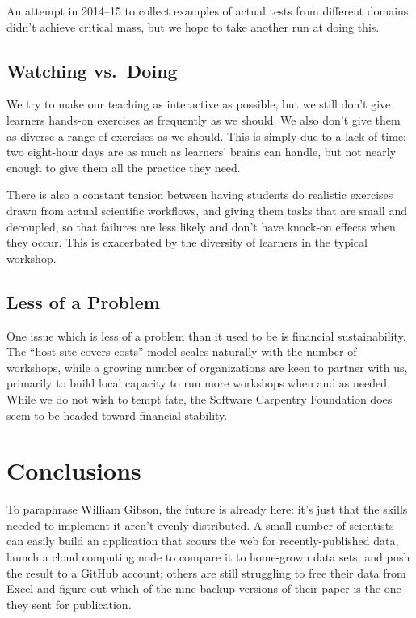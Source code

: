 \documentclass[10pt,a4paper,twocolumn]{article}
\begin{document}
An attempt in 2014--15 to collect examples of actual tests from
different domains didn't achieve critical mass, but we hope to take
another run at doing this.

\subsection{Watching vs.\ Doing}

We try to make our teaching as interactive as possible, but we still
don't give learners hands-on exercises as frequently as we should.  We
also don't give them as diverse a range of exercises as we should.
This is simply due to a lack of time: two eight-hour days are as much
as learners' brains can handle, but not nearly enough to give them all
the practice they need.

There is also a constant tension between having students do realistic
exercises drawn from actual scientific workflows, and giving them tasks
that are small and decoupled, so that failures are less likely and don't
have knock-on effects when they occur. This is exacerbated by the
diversity of learners in the typical workshop.

\subsection{Less of a Problem}

One issue which is less of a problem than it used to be is financial
sustainability. The ``host site covers costs'' model scales naturally
with the number of workshops, while a growing number of organizations
are keen to partner with us, primarily to build local capacity to run
more workshops when and as needed.  While we do not wish to tempt
fate, the Software Carpentry Foundation does seem to be headed toward
financial stability.

\section{Conclusions}

To paraphrase William Gibson, the future is already here: it's just
that the skills needed to implement it aren't evenly distributed. A
small number of scientists can easily build an application that scours
the web for recently-published data, launch a cloud computing node to
compare it to home-grown data sets, and push the result to a GitHub
account; others are still struggling to free their data from Excel and
figure out which of the nine backup versions of their paper is the one
they sent for publication.
\end{document}
